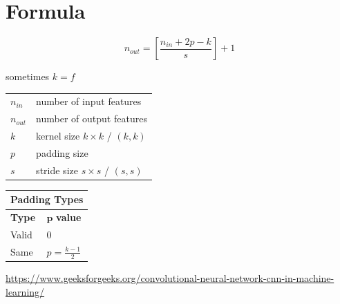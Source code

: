 \section{Formula}
\[
   \displaystyle n_{out} = \left[ \frac{n_{in} + 2p - k}{s} \right] + 1
\]

sometimes $k=f$

\begin{table}[h]
    \begin{minipage}[t]{0.5\linewidth}
        \begin{table}[H]
            \begin{tabular}{l l}
                $n_{in}$ & number of input features \\
                $n_{out}$ & number of output features \\
                $k$ & kernel size $k\times k$ / $(k, k)$ \\
                $p$ & padding size \\
                $s$ & stride size $s\times s$ / $(s, s)$ \\
            \end{tabular}
        \end{table}        
    \end{minipage}
    \hfill
    \begin{minipage}[t]{0.5\linewidth}
        \begin{table}[H]
            \begin{tabular}{l|l}
                \multicolumn{2}{c}{Padding Types}\\ \hline
                \textbf{Type} & $\mathbf{p}$ \textbf{value} \\ \hline
                Valid & 0 \\
                Same & \( \displaystyle p = \frac{k - 1}{2} \) \\
                
            \end{tabular}
        \end{table}        
    \end{minipage}
\end{table}






\vspace{5cm}
\url{https://www.geeksforgeeks.org/convolutional-neural-network-cnn-in-machine-learning/}


